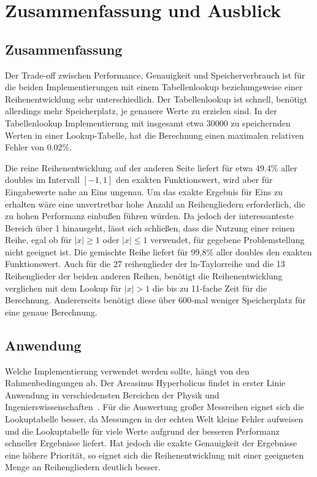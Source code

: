 \documentclass[course=erap] {aspdoc}
\begin{document}
    \section{Zusammenfassung und Ausblick}

    \subsection{Zusammenfassung}
    Der Trade-off zwischen Performance, Genauigkeit und Speicherverbrauch ist für die beiden Implementierungen mit einem Tabellenlookup beziehungsweise einer Reihenentwicklung sehr unterschiedlich.
    Der Tabellenlookup ist schnell, benötigt allerdings mehr Speicherplatz, je genauere Werte zu erzielen sind.
    In der Tabellenlookup Implementierung mit insgesamt etwa 30000 zu speichernden Werten in einer Lookup-Tabelle, hat die Berechnung einen maximalen relativen Fehler von 0.02\%.

    Die reine Reihenentwicklung auf der anderen Seite liefert für etwa 49.4\% aller doubles im Intervall $[-1, 1]$ den exakten Funktionswert, wird aber für Eingabewerte nahe an Eins ungenau.
    Um das exakte Ergebnis für Eins zu erhalten wäre eine unvertretbar hohe Anzahl an Reihengliedern erforderlich, die zu hohen Performanz einbußen führen würden.
    Da jedoch der interessanteste Bereich über 1 hinausgeht, lässt sich schließen, dass die Nutzung einer reinen Reihe, egal ob für $|x|\geq1$ oder $|x|\leq1$ verwendet, für gegebene Problemstellung nicht geeignet ist.
    Die gemischte Reihe liefert für 99,8\% aller doubles den exakten Funktionswert.
    Auch für die 27 reihenglieder der ln-Taylorreihe und die 13 Reihenglieder der beiden anderen Reihen, benötigt die Reihenentwicklung verglichen mit dem Lookup für $|x|>1$ die bis zu 11-fache Zeit für die Berechnung.
    Andererseits benötigt diese über 600-mal weniger Speicherplatz für eine genaue Berechnung.

    \subsection{Anwendung}
    Welche Implementierung verwendet werden sollte, hängt von den Rahmenbedingungen ab.
    Der Areasinus Hyperbolicus findet in erster Linie Anwendung in verschiedensten Bereichen der Physik und Ingenierswissenschaften~\cite{????}.
    Für die Auswertung großer Messreihen eignet sich die Lookuptabelle besser, da Messungen in der echten Welt kleine Fehler aufweisen und die Lookuptabelle für viele Werte aufgrund der besseren Performanz schneller Ergebnisse liefert.
    Hat jedoch die exakte Genauigkeit der Ergebnisse eine höhere Priorität, so eignet sich die Reihenentwicklung mit einer geeigneten Menge an Reihengliedern deutlich besser.
\end{document}
